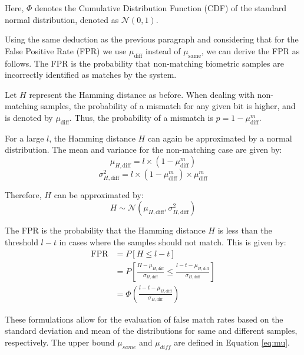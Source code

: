 Here, \(\Phi\) denotes the Cumulative Distribution Function (CDF) of the standard normal distribution, denoted as \(\mathcal{N}(0, 1)\).

Using the same deduction as the previous paragraph and considering that for the False Positive Rate (FPR) we use \(\mu_{\text{diff}}\) instead of \(\mu_{\text{same}}\), we can derive the FPR as follows. The FPR is the probability that non-matching biometric samples are incorrectly identified as matches by the system. 

Let \( H \) represent the Hamming distance as before. When dealing with non-matching samples, the probability of a mismatch for any given bit is higher, and is denoted by \( \mu_{\text{diff}} \). Thus, the probability of a mismatch is \( p = 1 - \mu_{\text{diff}}^m \).

For a large \( l \), the Hamming distance \( H \) can again be approximated by a normal distribution. The mean and variance for the non-matching case are given by:
\[
\mu_{H, \text{diff}} = l \times (1 - \mu_{\text{diff}}^m)
\]
\[
\sigma_{H, \text{diff}}^2 = l \times (1 - \mu_{\text{diff}}^m) \times \mu_{\text{diff}}^m
\]

Therefore, \( H \) can be approximated by:
\[
H \sim \mathcal{N}(\mu_{H, \text{diff}}, \sigma_{H, \text{diff}}^2)
\]

The FPR is the probability that the Hamming distance \( H \) is less than the threshold \( l - t \) in cases where the samples should not match. This is given by:
\[
\begin{aligned}
    \text{FPR} &= P[H \leq l - t] \\
    &= P\left[\frac{H - \mu_{H, \text{diff}}}{\sigma_{H, \text{diff}}} \leq \frac{l - t - \mu_{H, \text{diff}}}{\sigma_{H, \text{diff}}}\right] \\
    &= \Phi\left(\frac{l - t - \mu_{H, \text{diff}}}{\sigma_{H, \text{diff}}}\right)
\end{aligned}
\]



These formulations allow for the evaluation of false match rates based on the standard deviation and mean of the distributions for same and different samples, respectively. The upper bound \(\mu_{same}\) and \(\mu_{diff}\) are defined in Equation \ref{eq:mu}.

